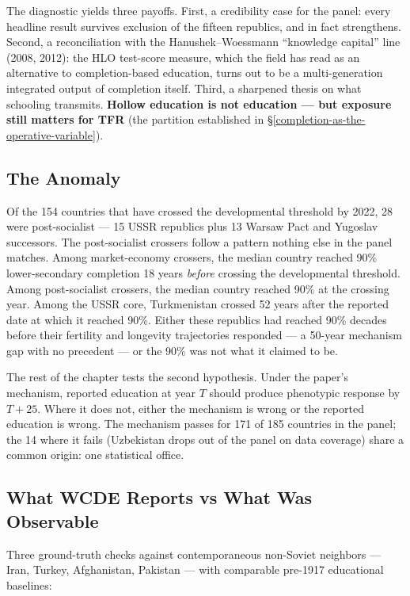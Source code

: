 \documentclass[12pt,letterpaper]{article}
\begin{document}
The diagnostic yields three payoffs. First, a credibility case for
the panel: every headline result survives exclusion of the fifteen
republics, and in fact strengthens. Second, a reconciliation with the
Hanushek--Woessmann ``knowledge capital'' line (2008, 2012): the HLO
test-score measure, which the field has read as an alternative to
completion-based education, turns out to be a multi-generation
integrated output of completion itself. Third, a sharpened thesis on
what schooling transmits. \textbf{Hollow education is not education
--- but exposure still matters for TFR} (the partition established
in \S\ref{completion-as-the-operative-variable}).

\subsection{The Anomaly}\label{goskomstat-anomaly-pattern}

Of the 154 countries that have crossed the developmental threshold
by 2022, 28 were post-socialist --- 15 USSR republics plus 13 Warsaw
Pact and Yugoslav successors. The post-socialist crossers follow a
pattern nothing else in the panel matches. Among market-economy
crossers, the median country reached 90\% lower-secondary completion
18 years \emph{before} crossing the developmental threshold. Among
post-socialist crossers, the median country reached 90\% at the
crossing year. Among the USSR core, Turkmenistan crossed 52 years
after the reported date at which it reached 90\%. Either these
republics had reached 90\% decades before their fertility and
longevity trajectories responded --- a 50-year mechanism gap with no
precedent --- or the 90\% was not what it claimed to be.

The rest of the chapter tests the second hypothesis. Under the
paper's mechanism, reported education at year $T$ should produce
phenotypic response by $T{+}25$. Where it does not, either the
mechanism is wrong or the reported education is wrong. The mechanism
passes for 171 of 185 countries in the panel; the 14 where it fails
(Uzbekistan drops out of the panel on data coverage) share a common
origin: one statistical office.

\subsection{What WCDE Reports vs What Was Observable}\label{what-wcde-reports}

Three ground-truth checks against contemporaneous non-Soviet
neighbors --- Iran, Turkey, Afghanistan, Pakistan --- with comparable
pre-1917 educational baselines:
\end{document}
